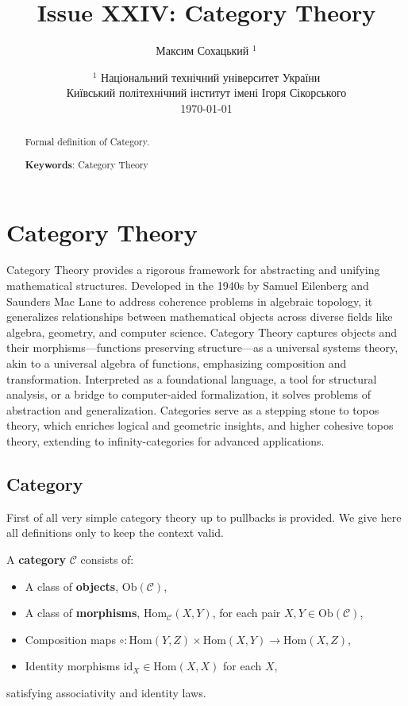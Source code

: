 \documentclass{article}
\begin{document}
\title{Issue XXIV: Category Theory}
\author{Максим Сохацький $^1$}
\date{ $^1$ Національний технічний університет України \\
       \small Київський політехнічний інститут імені Ігоря Сікорського \\
       \today }
\maketitle

\begin{abstract}

Formal definition of Category.

{\bf Keywords}: Category Theory \\
\end{abstract}

\ifincludeTOC
  \tableofcontents
\fi

\section{Category Theory}

Category Theory provides a rigorous framework for abstracting and unifying mathematical structures.
Developed in the 1940s by Samuel Eilenberg and Saunders Mac Lane to address coherence problems in
algebraic topology, it generalizes relationships between mathematical objects across diverse fields
like algebra, geometry, and computer science. Category Theory captures objects and their
morphisms—functions preserving structure—as a universal systems theory,
akin to a universal algebra of functions, emphasizing composition and transformation.
Interpreted as a foundational language, a tool for structural analysis,
or a bridge to computer-aided formalization, it solves problems of abstraction and generalization.
Categories serve as a stepping stone to topos theory, which enriches logical and geometric insights,
and higher cohesive topos theory, extending to infinity-categories for advanced applications.


\newpage
\subsection{Category}

First of all very simple category theory up to pullbacks is provided. We give here
all definitions only to keep the context valid.

A \textbf{category} $\mathcal{C}$ consists of:
\begin{itemize}
  \item A class of \textbf{objects}, $\mathrm{Ob}(\mathcal{C})$,
  \item A class of \textbf{morphisms}, $\mathrm{Hom}_{\mathcal{C}}(X,Y)$, for each pair $X,Y \in \mathrm{Ob}(\mathcal{C})$,
  \item Composition maps $\circ: \mathrm{Hom}(Y,Z) \times \mathrm{Hom}(X,Y) \to \mathrm{Hom}(X,Z)$,
  \item Identity morphisms $\mathrm{id}_X \in \mathrm{Hom}(X,X)$ for each $X$,
\end{itemize}
satisfying associativity and identity laws.
\end{document}

